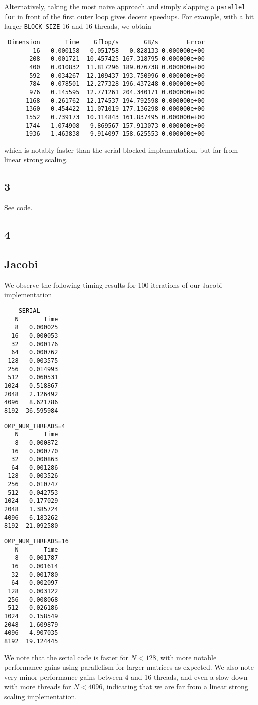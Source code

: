 \documentclass{article}
\begin{document}
Alternatively, taking the most naive approach and simply slapping a
\texttt{parallel for} in front of the first outer loop gives decent speedups.
For example, with a bit larger \texttt{BLOCK\_SIZE} 16 and 16 threads, we obtain 
\begin{verbatim}
 Dimension       Time    Gflop/s       GB/s        Error
        16   0.000158   0.051758   0.828133 0.000000e+00
       208   0.001721  10.457425 167.318795 0.000000e+00
       400   0.010832  11.817296 189.076738 0.000000e+00
       592   0.034267  12.109437 193.750996 0.000000e+00
       784   0.078501  12.277328 196.437248 0.000000e+00
       976   0.145595  12.771261 204.340171 0.000000e+00
      1168   0.261762  12.174537 194.792598 0.000000e+00
      1360   0.454422  11.071019 177.136298 0.000000e+00
      1552   0.739173  10.114843 161.837495 0.000000e+00
      1744   1.074908   9.869567 157.913073 0.000000e+00
      1936   1.463838   9.914097 158.625553 0.000000e+00
\end{verbatim}
which is notably faster than the serial blocked implementation, but far from
linear strong scaling.

\subsection*{3}
See code.

\subsection*{4}
\subsection{Jacobi}
We observe the following timing results for 100 iterations of our Jacobi
implementation
\begin{multicols}{3}
  \begin{verbatim}
    SERIAL
   N       Time
   8   0.000025
  16   0.000053
  32   0.000176
  64   0.000762
 128   0.003575
 256   0.014993
 512   0.060531
1024   0.518867
2048   2.126492
4096   8.621786
8192  36.595984
 \end{verbatim}
 \columnbreak
 \begin{verbatim}
OMP_NUM_THREADS=4
   N       Time
   8   0.000872
  16   0.000770
  32   0.000863
  64   0.001286
 128   0.003526
 256   0.010747
 512   0.042753
1024   0.177029
2048   1.385724
4096   6.183262
8192  21.092580
 \end{verbatim}
 \columnbreak
\begin{verbatim}
OMP_NUM_THREADS=16
   N       Time
   8   0.001787
  16   0.001614
  32   0.001780
  64   0.002097
 128   0.003122
 256   0.008068
 512   0.026186
1024   0.158549
2048   1.609879
4096   4.907035
8192  19.124445
  \end{verbatim}
\end{multicols} \vspace{-1.5\baselineskip} We note that the serial code is
faster for $N < 128$, with more notable performance gains using parallelism for
larger matrices as expected. We also note very minor performance gains between 4
and 16 threads, and even a slow down with more threads for $N < 4096$,
indicating that we are far from a linear strong scaling implementation.
\end{document}
